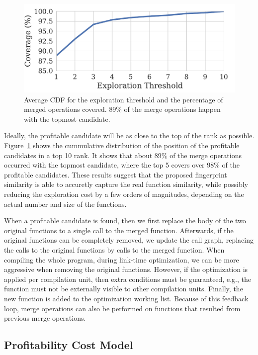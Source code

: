 \begin{figure}[t!]
  \centering
  \includegraphics[width=0.8\linewidth]{figs/average-cdf-exploration-threshold.pdf}
  \caption{Average CDF for the exploration threshold and the percentage of merged operations covered.
           89\% of the merge operations happen with the topmost candidate.}
  \label{fig:average-cdf-exploration-threshold}
\end{figure}

Ideally, the profitable candidate will be as close to the top of the rank as
possible.
Figure~\ref{fig:average-cdf-exploration-threshold} shows the cummulative
distribution of the position of the profitable candidates in a top 10 rank.
It shows that about 89\% of the merge operations occurred with the topmost
candidate, where the top 5 covers over 98\% of the profitable candidates.
These results suggest that the proposed fingerprint similarity is able to
accuretly capture the real function similarity, while possibly reducing the
exploration cost by a few orders of magnitudes, depending on the actual number
and size of the functions.

When a profitable candidate is found, then we first replace the body of the two
original functions to a single call to the merged function.
Afterwards, if the original functions can be completely removed, we update the
call graph, replacing the calls to the original functions by calls to the
merged function.
When compiling the whole program, during link-time optimization, we can be more
aggressive when removing the original functions.
However, if the optimization is applied per compilation unit, then extra
conditions must be guaranteed, e.g., the function must not be externally visible
to other compilation units.
Finally, the new function is added to the optimization working list.
Because of this feedback loop, merge operations can also be performed on
functions that resulted from previous merge operations.

\subsection{Profitability Cost Model}\label{sec:profit-model}

